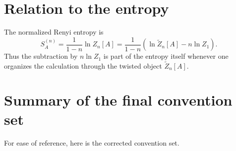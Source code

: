 \documentclass[11pt]{article}
\newcommand{\1}{\mathds{1}}
\newcommand{\br}[1]{\left(#1\right)}
\begin{document}
\section{Relation to the entropy}

The normalized Renyi entropy is
\begin{equation}
S_A^{(n)}=\frac{1}{1-n}\ln Z_n[A]
=
\frac{1}{1-n}\br{\ln \widetilde Z_n[A]-n\ln Z_1}.
\label{eq:entropy-final}
\end{equation}
Thus the subtraction by $n\ln Z_1$ is part of the entropy itself whenever one
organizes the calculation through the twisted object $\widetilde Z_n[A]$.

\section{Summary of the final convention set}

For ease of reference, here is the corrected convention set.
\end{document}
